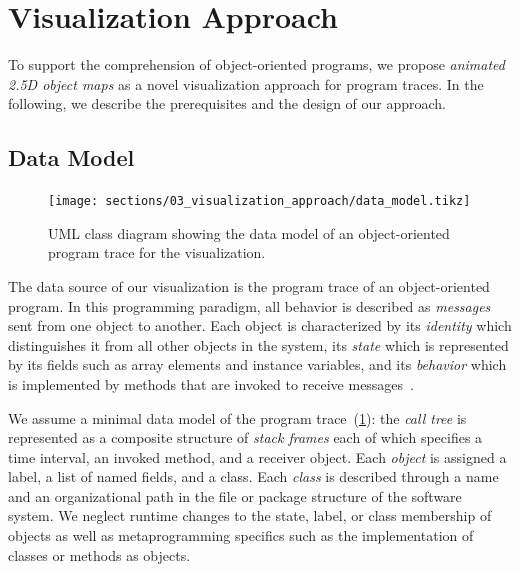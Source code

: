 \section{Visualization Approach}
\label{sec:visualization_approach}

To support the comprehension of object-oriented programs, we propose \emph{animated 2.5D object maps} as a novel visualization approach for program traces.
In the following, we describe the prerequisites and the design of our approach.

\subsection{Data Model}
\label{sec:visualization_approach/data_model}

\begin{figure}
	\texttt{[image: sections/03\_visualization\_approach/data\_model.tikz]}
	\caption{UML class diagram showing the data model of an object-oriented program trace for the visualization.}
	\label{fig:visualization_approach/data_model}
\end{figure}

The data source of our visualization is the program trace of an object-oriented program.
In this programming paradigm, all behavior is described as \emph{messages} sent from one object to another.
Each object is characterized by its \emph{identity} which distinguishes it from all other objects in the system, its \emph{state} which is represented by its fields such as array elements and instance variables, and its \emph{behavior} which is implemented by methods that are invoked to receive messages~\cite{thiede2023time}.

We assume a minimal data model of the program trace~(\cref{fig:visualization_approach/data_model}):
the \emph{call tree} is represented as a composite structure of \emph{stack frames} each of which specifies a time interval, an invoked method, and a receiver object.
Each \emph{object} is assigned a label, a list of named fields, and a class.
Each \emph{class} is described through a name and an organizational path in the file or package structure of the software system.
We neglect runtime changes to the state, label, or class membership of objects as well as metaprogramming specifics such as the implementation of classes or methods as objects.

